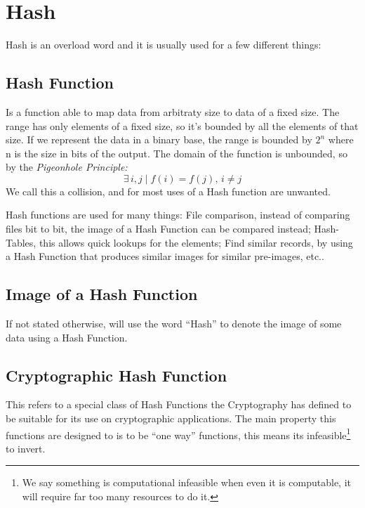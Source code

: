\section{Hash}
Hash is an overload word and it is usually used for a few different things:

\subsection{Hash Function}
Is a function able to map data from arbitraty size to data of a fixed size.
The range has only elements of a fixed size, so it's bounded by all the
  elements of that size. If we represent the data in a binary base, the range
  is bounded by $2^n$ where n is the size in bits of the output.
The domain of the function is unbounded, so by the \textit{Pigeonhole
  Principle:}
\begin{equation}
	\exists \, i, j \mid f(i) = f(j), \, i \neq j
\end{equation}
We call this a collision, and for most uses of a Hash function are unwanted.

Hash functions are used for many things: File comparison, instead of comparing
  files bit to bit, the image of a Hash Function can be compared instead;
  Hash-Tables, this allows quick lookups for the elements; Find similar
  records, by using a Hash Function that produces similar images for similar
  pre-images, etc..

\subsection{Image of a Hash Function}

If not stated otherwise, will use the word ``Hash'' to denote the image of
  some data using a Hash Function.

\subsection{Cryptographic Hash Function}
This refers to a special class of Hash Functions the Cryptography has defined
  to be suitable for its use on cryptographic applications. The main property
  this functions are designed to is to be ``one way'' functions, this means
  its infeasible\footnote{We say something is computational infeasible when even
  it is computable, it will require far too many resources to do it.} to invert.

